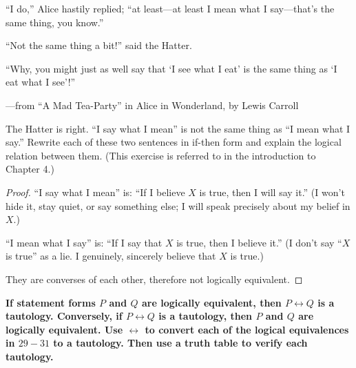 \documentclass[14pt]{extarticle}
\newcommand{\bic}{\leftrightarrow}
\begin{document}
“I do,” Alice hastily replied; “at least—at least I mean what I say—that’s the same thing, you know.”

“Not the same thing a bit!” said the Hatter.

“Why, you might just as well say that ‘I see what I eat’ is the same thing as ‘I eat what I see’!”

—from “A Mad Tea-Party” in Alice in Wonderland, by Lewis Carroll

The Hatter is right. “I say what I mean” is not the same thing as “I mean what I say.” Rewrite each of these two sentences in if-then form and explain the logical relation between them. (This exercise is referred to in the introduction to Chapter 4.)

\begin{proof}
    “I say what I mean” is: ``If I believe $X$ is true, then I will
    say it.'' (I won't hide it, stay quiet, or say something else; I will speak precisely about my belief in $X$.)

    “I mean what I say” is: ``If I say that $X$ is true, then I believe it.'' (I don't say ``$X$ is true'' as a lie. I genuinely, sincerely believe that $X$ is true.)

    They are converses of each other, therefore not logically equivalent.
\end{proof}

{\bf If statement forms $P$ and $Q$ are logically equivalent, then $P \bic Q$ is a tautology. Conversely, if $P \bic Q$ is a tautology, then $P$ and $Q$ are logically equivalent. Use $\bic$ to convert each of the logical equivalences in $29-31$ to a tautology. Then use a truth table to verify each tautology.}
\end{document}
